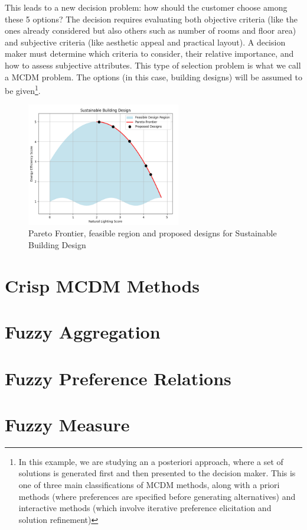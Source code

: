 This leads to a new decision problem: how should the customer choose among these 5 options? The decision requires evaluating both objective criteria (like the ones already considered but also others such as number of rooms and floor area) and subjective criteria (like aesthetic appeal and practical layout). A decision maker must determine which criteria to consider, their relative importance, and how to assess subjective attributes. This type of selection problem is what we call a MCDM problem. The options (in this case, building designs) will be assumed to be given\footnote{
In this example, we are studying an a posteriori approach, where a set of solutions is generated first and then presented to the decision maker. This is one of three main classifications of MCDM methods, along with a priori methods (where preferences are specified before generating alternatives) and interactive methods (which involve iterative preference elicitation and solution refinement)}.

\begin{figure}[ht]
    \centering
    \includegraphics[width=0.6\textwidth]{ch2/figures/pareto.png}
    \caption{Pareto Frontier, feasible region and proposed designs for Sustainable Building Design}
    \label{fig:pareto_frontier}
\end{figure}

\section{Crisp MCDM Methods}

\section{Fuzzy Aggregation}


\section{Fuzzy Preference Relations}
\section{Fuzzy Measure}

